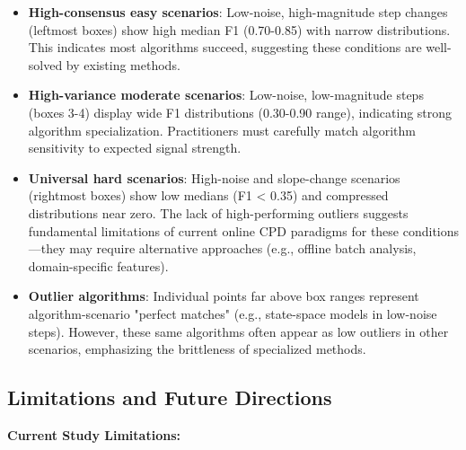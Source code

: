 \begin{itemize}
    \item \textbf{High-consensus easy scenarios}: Low-noise, high-magnitude step changes (leftmost boxes) show high median F1 (0.70-0.85) with narrow distributions. This indicates most algorithms succeed, suggesting these conditions are well-solved by existing methods.
    
    \item \textbf{High-variance moderate scenarios}: Low-noise, low-magnitude steps (boxes 3-4) display wide F1 distributions (0.30-0.90 range), indicating strong algorithm specialization. Practitioners must carefully match algorithm sensitivity to expected signal strength.
    
    \item \textbf{Universal hard scenarios}: High-noise and slope-change scenarios (rightmost boxes) show low medians (F1 < 0.35) and compressed distributions near zero. The lack of high-performing outliers suggests fundamental limitations of current online CPD paradigms for these conditions—they may require alternative approaches (e.g., offline batch analysis, domain-specific features).
    
    \item \textbf{Outlier algorithms}: Individual points far above box ranges represent algorithm-scenario "perfect matches" (e.g., state-space models in low-noise steps). However, these same algorithms often appear as low outliers in other scenarios, emphasizing the brittleness of specialized methods.
\end{itemize}


\subsection{Limitations and Future Directions}

\textbf{Current Study Limitations:}


